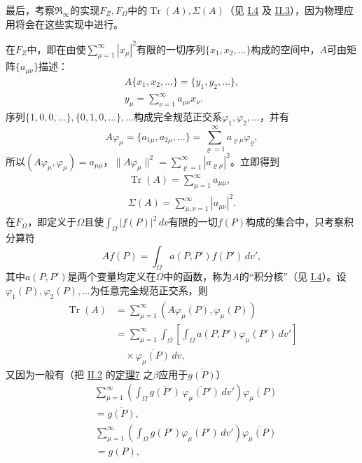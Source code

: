 \documentclass[fontsize=13pt,twoside,openany,headings=normal,parskip=false,bookmarkpackage=false,DIV=calc]{scrbook}
\begin{document}
最后，考察$\mathfrak R_\infty$的实现$F_Z,\allowbreak F_\Omega$中的$\operatorname{Tr}(A),\allowbreak \Sigma(A)$（见 \hyperref[sec:I.4]{I.4} 及 \hyperref[sec:II.3]{II.3}），因为物理应用将会在这些实现中进行。

在$F_Z$中，即在由使$\sum_{\mu=1}^{\infty}|x_\mu|^2$有限的一切序列$\{x_1,\allowbreak x_2,\allowbreak \ldots\}$构成的空间中，$A$可由矩阵$\{a_{\mu\nu}\}$描述：
\begin{gather*}
A\{x_1,x_2,\ldots\}=\{y_1,y_2,\ldots\},\\
 y_\mu=\sum_{\nu=1}^{\infty}a_{\mu\nu}x_\nu.
\end{gather*}
序列$\{1,\allowbreak 0,\allowbreak 0,\allowbreak \ldots\},\allowbreak \{0,\allowbreak 1,\allowbreak 0,\allowbreak \ldots\},\allowbreak \ldots$构成完全规范正交系$\varphi_1,\allowbreak \varphi_2,\allowbreak \ldots$，并有
\[
A\varphi_\mu=\{a_{1\mu},a_{2\mu},\ldots\}
=\sum_{\varrho=1}^{\infty}a_{\varrho\mu}\varphi_\varrho,
\]
所以$(A\varphi_\mu,\allowbreak \varphi_\mu)=a_{\mu\mu}$，$\|A\varphi_\mu\|^2=\sum_{\varrho=1}^{\infty}|a_{\varrho\mu}|^2$。立即得到
\begin{gather*}
\operatorname{Tr}(A)=\sum_{\mu=1}^{\infty}a_{\mu\mu},\\
\Sigma(A)=\sum_{\mu,\nu=1}^{\infty}|a_{\mu\nu}|^2.
\end{gather*}
在$F_\Omega$，即定义于$\Omega$且使$\int_\Omega|f(P)|^2\,dv$有限的一切$f(P)$构成的集合中，只考察积分算符
\[
Af(P)=\int_\Omega a(P,P')f(P')\,dv',
\]
其中$a(P,\allowbreak P')$是两个变量均定义在$\Omega$中的函数，称为$A$的“积分核”（见 \hyperref[sec:I.4]{I.4}）。设$\varphi_1(P),\allowbreak \varphi_2(P),\allowbreak \ldots$为任意完全规范正交系，则
\begin{align*}
\operatorname{Tr}(A)
&=\sum_{\mu=1}^{\infty}(A\varphi_\mu(P),\varphi_\mu(P))\\
&=\sum_{\mu=1}^{\infty}\int_\Omega
\left[\int_\Omega a(P,P')\varphi_\mu(P')\,dv'\right]\\
&\quad\times\overline{\varphi_\mu(P)}\,dv,
\end{align*}\hypertarget{origpage-101}{}\label{origpage-101}又因为一般有（把 \hyperref[sec:II.2]{II.2} 的\CJKglue \hyperref[thm:II.7]{定理7} 之$\beta$应用于$\overline{g(P)}$）
\begin{align*}
&\sum_{\mu=1}^{\infty}\left(\int_\Omega\overline{g(P')}\,
\overline{\varphi_\mu(P')}\,dv'\right)\varphi_\mu(P)\\
&=\overline{g(P)},
\end{align*}
\begin{align*}
&\sum_{\mu=1}^{\infty}\left(\int_\Omega g(P')\varphi_\mu(P')\,dv'\right)
\overline{\varphi_\mu(P)}\\
&=g(P),
\end{align*}
\end{document}
